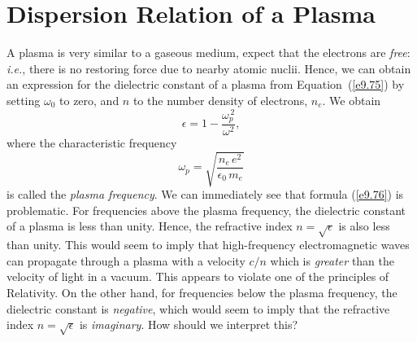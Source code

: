 \section{Dispersion Relation of a Plasma}\label{s9.7}
A plasma is very similar to a gaseous medium, expect that the electrons
are {\em free}: {\em i.e.}, there is no restoring force due to nearby atomic
nuclii. Hence,  we can obtain an expression for the dielectric constant
of a plasma from Equation~(\ref{e9.75}) by setting $\omega_0$ to zero,
and $n$ to the number density of electrons, $n_e$.
We obtain
\begin{equation}\label{e9.76}
\epsilon = 1 - \frac{\omega_p^{\,2}}{\omega^2},
\end{equation}
where the characteristic frequency
\begin{equation}\label{e9.77}
\omega_p = \sqrt{\frac{n_e\,e^2}{\epsilon_0\,m_e}}
\end{equation}
is called the {\em plasma frequency}.
We can immediately see that formula (\ref{e9.76}) is problematic.
For frequencies above the plasma frequency, the dielectric constant
of a plasma is less than unity. Hence, the refractive
index $n=\sqrt{\epsilon}$ is also less than unity. This would seem to imply that
high-frequency electromagnetic waves can propagate through a plasma with
a velocity $c/n$ which is {\em greater}\/ than the velocity of
light in a vacuum. This appears to violate one of the principles of Relativity. 
On the other hand, for frequencies below the plasma frequency, the dielectric constant
is {\em negative}, which would seem to imply that the refractive
index $n=\sqrt{\epsilon}$ is {\em imaginary}. How should we interpret this?


